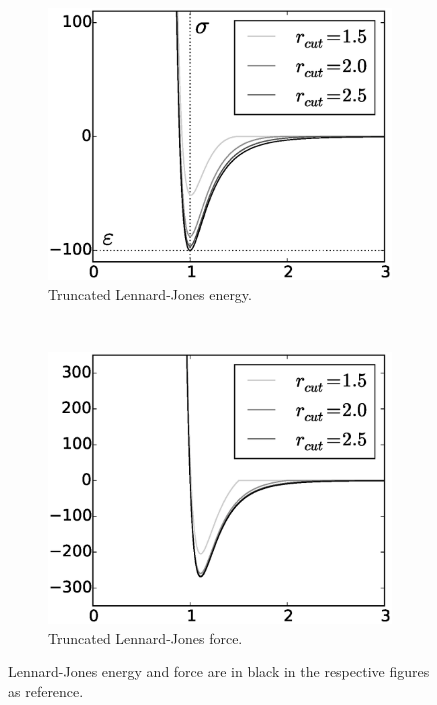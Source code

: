 	\begin{figure}[t!]
		\centering
		\begin{subfigure}[t]{.5\textwidth}
			\centering
			\includegraphics[scale=.5]{./fig/ch2/ljc_e.eps}
			\caption{Truncated Lennard-Jones energy. \label{subfig:LJTEnergy}}
		\end{subfigure}%
		~
		\begin{subfigure}[t]{.5\textwidth}
			\centering
			\includegraphics[scale=.5]{./fig/ch2/ljc_f.eps}
			\caption{Truncated Lennard-Jones force. \label{subfig:LJTForce}}
		\end{subfigure}		
		\caption{Lennard-Jones energy and force are in black in the respective figures as reference.\label{fig:LJT}}	
	\end{figure}	

